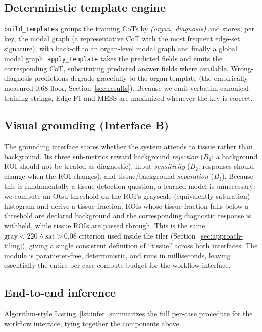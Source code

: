 \documentclass[11pt,a4paper]{article}
\newcommand{\code}[1]{\texttt{\small #1}}
\begin{document}
\subsection{Deterministic template engine}
\code{build\_templates} groups the training CoTs by \emph{(organ, diagnosis)} and stores, per
key, the modal graph (a representative CoT with the most frequent edge-set signature), with
back-off to an organ-level modal graph and finally a global modal graph.
\code{apply\_template} takes the predicted fields and emits the corresponding CoT, substituting
predicted answer fields where available. Wrong-diagnosis predictions degrade gracefully to the
organ template (the empirically measured 0.68 floor, Section~\ref{sec:results}). Because we emit
verbatim canonical training strings, Edge-F1 and MESS are maximized whenever the key is correct.

\subsection{Visual grounding (Interface B)}
\label{sec:approach-grounding}
The grounding interface scores whether the system attends to tissue rather than background. Its
three sub-metrics reward background \emph{rejection} ($B_1$: a background ROI should not be
treated as diagnostic), input \emph{sensitivity} ($B_2$: responses should change when the ROI
changes), and tissue/background \emph{separation} ($B_3$). Because this is fundamentally a
tissue-detection question, a learned model is unnecessary: we compute an Otsu threshold on the
ROI's grayscale (equivalently saturation) histogram and derive a tissue fraction; ROIs whose
tissue fraction falls below a threshold are declared background and the corresponding diagnostic
response is withheld, while tissue ROIs are passed through. This is the same
$\text{gray}<220 \wedge \text{sat}>0.08$ criterion used inside the tiler
(Section~\ref{sec:approach-tiling}), giving a single consistent definition of ``tissue'' across
both interfaces. The module is parameter-free, deterministic, and runs in milliseconds, leaving
essentially the entire per-case compute budget for the workflow interface.

\subsection{End-to-end inference}
Algorithm-style Listing~\ref{lst:infer} summarizes the full per-case procedure for the workflow
interface, tying together the components above.
\end{document}
